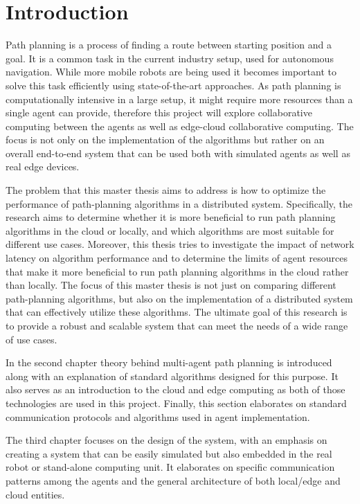 \chapter{Introduction}

Path planning is a process of finding a route between starting position and a goal. It is a common task in the current industry setup, used for autonomous navigation. While more mobile robots are being used it becomes important to solve this task efficiently using state-of-the-art approaches. As path planning is computationally intensive in a large setup, it might require more resources than a single agent can provide, therefore this project will explore collaborative computing between the agents as well as edge-cloud collaborative computing. The focus is not only on the implementation of the algorithms but rather on an overall end-to-end system that can be used both with simulated agents as well as real edge devices.

The problem that this master thesis aims to address is how to optimize the performance of path-planning algorithms in a distributed system. Specifically, the research aims to determine whether it is more beneficial to run path planning algorithms in the cloud or locally, and which algorithms are most suitable for different use cases. Moreover, this thesis tries to investigate the impact of network latency on algorithm performance and to determine the limits of agent resources that make it more beneficial to run path planning algorithms in the cloud rather than locally. The focus of this master thesis is not just on comparing different path-planning algorithms, but also on the implementation of a distributed system that can effectively utilize these algorithms. The ultimate goal of this research is to provide a robust and scalable system that can meet the needs of a wide range of use cases.

In the second chapter theory behind multi-agent path planning is introduced along with an explanation of standard algorithms designed for this purpose. It also serves as an introduction to the cloud and edge computing as both of those technologies are used in this project. Finally, this section elaborates on standard communication protocols and algorithms used in agent implementation.

The third chapter focuses on the design of the system, with an emphasis on creating a system that can be easily simulated but also embedded in the real robot or stand-alone computing unit. It elaborates on specific communication patterns among the agents and the general architecture of both local/edge and cloud entities.


